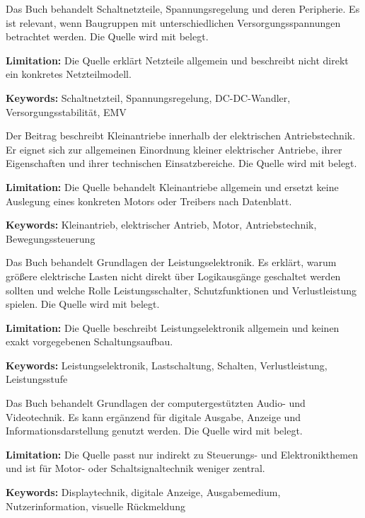 
{ 
	Das Buch behandelt Schaltnetzteile, Spannungsregelung und deren Peripherie. Es ist relevant, wenn Baugruppen mit unterschiedlichen Versorgungsspannungen betrachtet werden. Die Quelle wird mit \cite{Schlienz:2020} belegt.
	
	\bigskip
	
	\textbf{Limitation:} Die Quelle erklärt Netzteile allgemein und beschreibt nicht direkt ein konkretes Netzteilmodell.
	
	\scriptsize{\textbf{Keywords:} Schaltnetzteil, Spannungsregelung, DC-DC-Wandler, Versorgungsstabilität, EMV}
}



{ 
	Der Beitrag beschreibt Kleinantriebe innerhalb der elektrischen Antriebstechnik. Er eignet sich zur allgemeinen Einordnung kleiner elektrischer Antriebe, ihrer Eigenschaften und ihrer technischen Einsatzbereiche. Die Quelle wird mit \cite{Schroeder:2017} belegt.
	
	\bigskip
	
	\textbf{Limitation:} Die Quelle behandelt Kleinantriebe allgemein und ersetzt keine Auslegung eines konkreten Motors oder Treibers nach Datenblatt.
	
	\scriptsize{\textbf{Keywords:} Kleinantrieb, elektrischer Antrieb, Motor, Antriebstechnik, Bewegungssteuerung}
}



{ 
	Das Buch behandelt Grundlagen der Leistungselektronik. Es erklärt, warum größere elektrische Lasten nicht direkt über Logikausgänge geschaltet werden sollten und welche Rolle Leistungsschalter, Schutzfunktionen und Verlustleistung spielen. Die Quelle wird mit \cite{Specovius:2025} belegt.
	
	\bigskip
	
	\textbf{Limitation:} Die Quelle beschreibt Leistungselektronik allgemein und keinen exakt vorgegebenen Schaltungsaufbau.
	
	\scriptsize{\textbf{Keywords:} Leistungselektronik, Lastschaltung, Schalten, Verlustleistung, Leistungsstufe}
}



{ 
	Das Buch behandelt Grundlagen der computergestützten Audio- und Videotechnik. Es kann ergänzend für digitale Ausgabe, Anzeige und Informationsdarstellung genutzt werden. Die Quelle wird mit \cite{Stotz:2019} belegt.
	
	\bigskip
	
	\textbf{Limitation:} Die Quelle passt nur indirekt zu Steuerungs- und Elektronikthemen und ist für Motor- oder Schaltsignaltechnik weniger zentral.
	
	\scriptsize{\textbf{Keywords:} Displaytechnik, digitale Anzeige, Ausgabemedium, Nutzerinformation, visuelle Rückmeldung}
}


